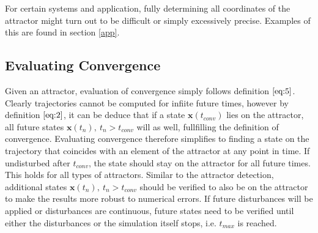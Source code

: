 For certain systems and application, fully determining all coordinates of the attractor might turn out to be difficult or simply excessively precise. Examples of this are found in section \ref{app}.


    

\subsection{Evaluating Convergence} \label{convergence}
    
    Given an attractor, evaluation of convergence simply follows definition $\ref{eq:5}$. Clearly trajectories cannot be computed for infiite future times, however by definition $\ref{eq:2}$, it can be deduce that if a state $\mathbf{x}(t_{conv})$ lies on the attractor, all future states $\mathbf{x}(t_n),\ t_n > t_{conv}$ will as well, fullfilling the definition of convergence. 
 Evaluating convergence therefore simplifies to finding a state on the trajectory that coincides with an element of the attractor at any point in time. If undisturbed after $t_{conv}$, the state should stay on the attractor for all future times. This holds for all types of attractors. Similar to the attractor detection, additional states $\mathbf{x}(t_n),\ t_n>t_{conv}$ should be verified to also be on the attractor to make the results more robust to numerical errors. If future disturbances will be applied or disturbances are continuous, future states need to be verified until either the disturbances or the simulation itself stops, i.e. $t_{max}$ is reached. 

